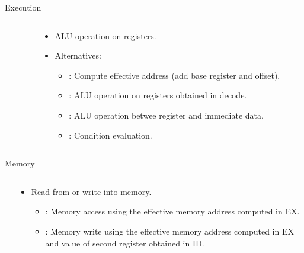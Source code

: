 \begin{frame}[t]{Execution}
\begin{columns}
\begin{column}{.3\textwidth}

\end{column}
\begin{column}{.7\textwidth}
\begin{itemize}
  \item ALU operation on registers.
  \item Alternatives:
    \begin{itemize}
      \item {}:
            Compute effective address (add base register and offset).
      \item {}:
            ALU operation on registers obtained in decode.
      \item {}:
            ALU operation betwee register and immediate data.
      \item {}:
            Condition evaluation.
    \end{itemize}
\end{itemize}
\end{column}
\end{columns}
\end{frame}

\begin{frame}[t]{Memory}
\begin{columns}
\begin{column}{.3\textwidth}
\begin{center}

\end{center}
\end{column}
\begin{column}{.7\textwidth}
\begin{itemize}
  \item Read from or write into memory.
    \begin{itemize}
      \item {}:
            Memory access using the effective memory address computed in EX.
      \item {}:
            Memory write using the effective memory address computed in EX
            and value of second register obtained in ID.
    \end{itemize}
\end{itemize}
\end{column}
\end{columns}
\end{frame}


